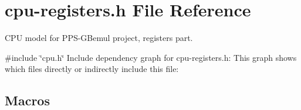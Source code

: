 \hypertarget{cpu-registers_8h}{}\section{cpu-\/registers.h File Reference}
\label{cpu-registers_8h}


C\+PU model for P\+P\+S-\/\+G\+Bemul project, registers part.  


{\ttfamily \#include \char`\"{}cpu.\+h\char`\"{}}\newline
Include dependency graph for cpu-\/registers.h\+:
This graph shows which files directly or indirectly include this file\+:
\subsection*{Macros}
